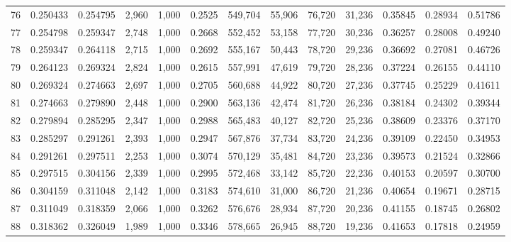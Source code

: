 \begin{tabular}{rrrrrrrrrrrrr}
76  &  0.250433 &  0.254795 &   2,960 &  1,000 &                                     0.2525 &  549,704 &   55,906 &   76,720 &   31,236 &  0.35845 &  0.28934 &  0.51786 \\
77  &  0.254798 &  0.259347 &   2,748 &  1,000 &                                     0.2668 &  552,452 &   53,158 &   77,720 &   30,236 &  0.36257 &  0.28008 &  0.49240 \\
78  &  0.259347 &  0.264118 &   2,715 &  1,000 &                                     0.2692 &  555,167 &   50,443 &   78,720 &   29,236 &  0.36692 &  0.27081 &  0.46726 \\
79  &  0.264123 &  0.269324 &   2,824 &  1,000 &                                     0.2615 &  557,991 &   47,619 &   79,720 &   28,236 &  0.37224 &  0.26155 &  0.44110 \\
80  &  0.269324 &  0.274663 &   2,697 &  1,000 &                                     0.2705 &  560,688 &   44,922 &   80,720 &   27,236 &  0.37745 &  0.25229 &  0.41611 \\
81  &  0.274663 &  0.279890 &   2,448 &  1,000 &                                     0.2900 &  563,136 &   42,474 &   81,720 &   26,236 &  0.38184 &  0.24302 &  0.39344 \\
82  &  0.279894 &  0.285295 &   2,347 &  1,000 &                                     0.2988 &  565,483 &   40,127 &   82,720 &   25,236 &  0.38609 &  0.23376 &  0.37170 \\
83  &  0.285297 &  0.291261 &   2,393 &  1,000 &                                     0.2947 &  567,876 &   37,734 &   83,720 &   24,236 &  0.39109 &  0.22450 &  0.34953 \\
84  &  0.291261 &  0.297511 &   2,253 &  1,000 &                                     0.3074 &  570,129 &   35,481 &   84,720 &   23,236 &  0.39573 &  0.21524 &  0.32866 \\
85  &  0.297515 &  0.304156 &   2,339 &  1,000 &                                     0.2995 &  572,468 &   33,142 &   85,720 &   22,236 &  0.40153 &  0.20597 &  0.30700 \\
86  &  0.304159 &  0.311048 &   2,142 &  1,000 &                                     0.3183 &  574,610 &   31,000 &   86,720 &   21,236 &  0.40654 &  0.19671 &  0.28715 \\
87  &  0.311049 &  0.318359 &   2,066 &  1,000 &                                     0.3262 &  576,676 &   28,934 &   87,720 &   20,236 &  0.41155 &  0.18745 &  0.26802 \\
88  &  0.318362 &  0.326049 &   1,989 &  1,000 &                                     0.3346 &  578,665 &   26,945 &   88,720 &   19,236 &  0.41653 &  0.17818 &  0.24959 \\

\end{tabular}
